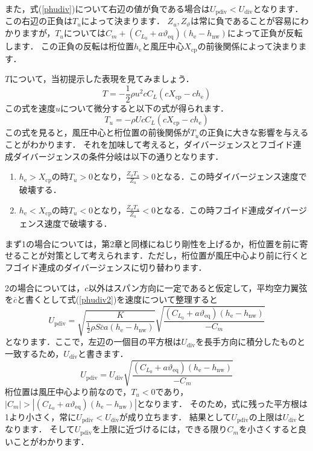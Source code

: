 \documentclass{jarticle}
\begin{document}
また，式(\ref{phudiv})について右辺の値が負である場合は$U_\mathrm{pdiv} < U_\mathrm{div}$となります．この右辺の正負は$T_u$によって決まります．
$Z_u,Z_\vartheta$は常に負であることが容易にわかりますが，$T_u$については$C_m +  (C_{L_0} + a\vartheta_\mathrm{eq})  (h_\mathrm{e}-h_\mathrm{nw})$によって正負が反転します．
この正負の反転は桁位置$h_\mathrm{e}$と風圧中心$X_\mathrm{cp}$の前後関係によって決まります．

$T$について，当初提示した表現を見てみましょう．
\begin{equation}
    T = -\frac{1}{2}\rho u^2 c C_L (cX_\mathrm{cp} - ch_\mathrm{e})
\end{equation}
この式を速度$u$について微分すると以下の式が得られます．
\begin{equation}
    T_u = -\rho U c C_L (cX_\mathrm{cp} - ch_\mathrm{e})
\end{equation}
この式を見ると，風圧中心と桁位置の前後関係が$T_u$の正負に大きな影響を与えることがわかります．
それを加味して考えると，ダイバージェンスとフゴイド連成ダイバージェンスの条件分岐は以下の通りとなります．
\begin{enumerate}
    \item $h_\mathrm{e} > X_\mathrm{cp}$の時$T_u>0$となり，$\frac{Z_\vartheta T_u}{Z_u} > 0$となる．この時ダイバージェンス速度で破壊する．
    \item $h_\mathrm{e} < X_\mathrm{cp}$の時$T_u<0$となり，$\frac{Z_\vartheta T_u}{Z_u} < 0$となる．この時フゴイド連成ダイバージェンス速度で破壊する．
\end{enumerate}

まず1の場合については，第2章と同様にねじり剛性を上げるか，桁位置を前に寄せることが対策として考えられます．ただし，桁位置が風圧中心より前に行くとフゴイド連成のダイバージェンスに切り替わります．

2の場合については，$c$以外はスパン方向に一定であると仮定して，平均空力翼弦を$\bar{c}$と書くとして式(\ref{phudiv2})を速度について整理すると
\begin{equation}
    U_\mathrm{pdiv} = \sqrt{ \frac{K}{\frac{1}{2}\rho S\bar{c}a(h_\mathrm{e}-h_\mathrm{nw})} } \sqrt{\frac{(C_{L_0}+a\vartheta_\mathrm{eq})(h_\mathrm{e}-h_\mathrm{nw})}{-C_m}}
\end{equation}
となります．ここで，左辺の一個目の平方根は$U_\mathrm{div}$を長手方向に積分したものと一致するため，$U_\mathrm{div}$と書きます．
\begin{equation}
    U_\mathrm{pdiv} = U_\mathrm{div} \sqrt{\frac{(C_{L_0}+a\vartheta_\mathrm{eq})(h_\mathrm{e}-h_\mathrm{nw})}{-C_m}}
\end{equation}
桁位置は風圧中心より前なので，$T_u<0$であり，$|C_m| >  |(C_{L_0} + a\vartheta_\mathrm{eq})  (h_\mathrm{e}-h_\mathrm{nw})|$となります．
そのため，式に残った平方根は1より小さく，常に$U_\mathrm{pdiv} < U_\mathrm{div}$が成り立ちます．
結果として$U_\mathrm{pdiv}$の上限は$U_\mathrm{div}$となります．
そして$U_\mathrm{pdiv}$を上限に近づけるには，できる限り$C_m$を小さくすると良いことがわかります．
\end{document}
